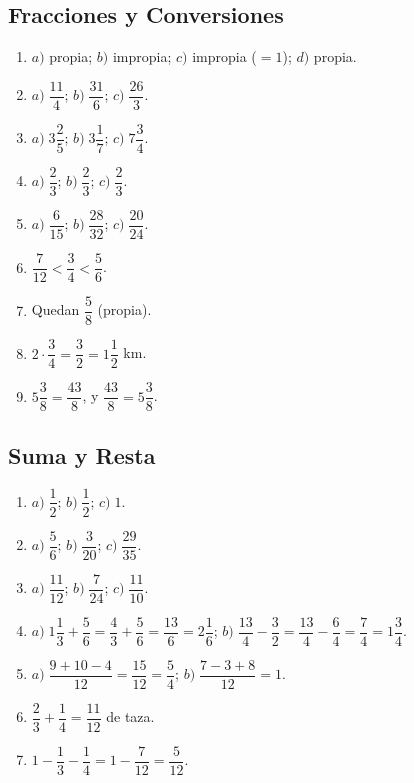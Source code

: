\documentclass[12pt, letterpaper]{article}
\begin{document}
  \subsection*{Fracciones y Conversiones}
  \begin{enumerate}[leftmargin=*, label=\textbf{\arabic*.}]
    \item $a)$ propia; \quad $b)$ impropia; \quad $c)$ impropia ($=1$); \quad $d)$ propia.
    \item $a)\; \dfrac{11}{4}$; \quad $b)\; \dfrac{31}{6}$; \quad $c)\; \dfrac{26}{3}$.
    \item $a)\; 3\dfrac{2}{5}$; \quad $b)\; 3\dfrac{1}{7}$; \quad $c)\; 7\dfrac{3}{4}$.
    \item $a)\; \dfrac{2}{3}$; \quad $b)\; \dfrac{2}{3}$; \quad $c)\; \dfrac{2}{3}$.
    \item $a)\; \dfrac{6}{15}$; \quad $b)\; \dfrac{28}{32}$; \quad $c)\; \dfrac{20}{24}$.
    \item $\dfrac{7}{12} < \dfrac{3}{4} < \dfrac{5}{6}$.
    \item Quedan $\dfrac{5}{8}$ (propia).
    \item $2 \cdot \dfrac{3}{4} = \dfrac{3}{2} = 1\dfrac{1}{2}$ km.
    \item $5\dfrac{3}{8} = \dfrac{43}{8}$, y $\dfrac{43}{8} = 5\dfrac{3}{8}$. \checkmark
  \end{enumerate}

  \subsection*{Suma y Resta}
  \begin{enumerate}[leftmargin=*, label=\textbf{\arabic*.}]
    \item $a)\; \dfrac{1}{2}$; \quad $b)\; \dfrac{1}{2}$; \quad $c)\; 1$.
    \item $a)\; \dfrac{5}{6}$; \quad $b)\; \dfrac{3}{20}$; \quad $c)\; \dfrac{29}{35}$.
    \item $a)\; \dfrac{11}{12}$; \quad $b)\; \dfrac{7}{24}$; \quad $c)\; \dfrac{11}{10}$.
    \item $a)\; 1\dfrac{1}{3} + \dfrac{5}{6} = \dfrac{4}{3} + \dfrac{5}{6} = \dfrac{13}{6} = 2\dfrac{1}{6}$; \quad $b)\; \dfrac{13}{4} - \dfrac{3}{2} = \dfrac{13}{4} - \dfrac{6}{4} = \dfrac{7}{4} = 1\dfrac{3}{4}$.
    \item $a)\; \dfrac{9 + 10 - 4}{12} = \dfrac{15}{12} = \dfrac{5}{4}$; \quad $b)\; \dfrac{7 - 3 + 8}{12} = 1$.
    \item $\dfrac{2}{3} + \dfrac{1}{4} = \dfrac{11}{12}$ de taza.
    \item $1 - \dfrac{1}{3} - \dfrac{1}{4} = 1 - \dfrac{7}{12} = \dfrac{5}{12}$.
  \end{enumerate}
\end{document}
